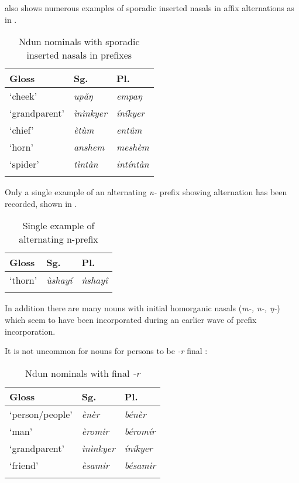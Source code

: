 \documentclass[output=paper]{langsci/langscibook}
\begin{document}
 also shows numerous examples of sporadic inserted nasals in affix alternations as in . 


\begin{table}
\caption{Ndun nominals with sporadic inserted nasals in prefixes}
\label{extab:nomaffplat:29}
\begin{tabularx}{.8\textwidth}{XXl}
\lsptoprule
 {Gloss} 	& {Sg.} 	&   {Pl.}\\
\midrule‘cheek’ 	&  \itshape upǎŋ 	&  \itshape empaŋ\\
‘grandparent’ 	&  \itshape ìnìnkyer 	&  \itshape íníkyer\\
‘chief’ 	&  \itshape ètùm 	&  \itshape entûm\\
‘horn’ 	&  \itshape anshem 	&  \itshape meshèm\\
‘spider’ 	&  \itshape tìntàn 	&  \itshape intíntàn\\
\lspbottomrule
\end{tabularx}
\end{table}


Only a single example of an alternating \textit{n-} prefix showing alternation has been recorded, shown in .

\begin{table}
\caption{Single example of alternating n-prefix}
\label{extab:nomaffplat:30}
\begin{tabularx}{.8\textwidth}{XXl}
\lsptoprule
Gloss 	& {Sg.} 	& {Pl.}\\
\midrule
‘thorn’ 	&  \itshape ùshayí 	&  \itshape ǹshayî\\
\lspbottomrule
\end{tabularx}
\end{table}
 
\newpage  
In addition there are many nouns with initial homorganic nasals (\textit{m-, n-, ŋ-}) which seem to have been incorporated during an earlier wave of prefix incorporation.

It is not uncommon for  nouns for persons to be \textit{-r} final :

\begin{table}
\caption{Ndun nominals with final \textit{-r}}
\label{extab:nomaffplat:31}
\begin{tabularx}{.8\textwidth}{XXl}
\lsptoprule
Gloss 	& {Sg.} 	& {Pl.}\\
\midrule
‘person/people’ 	&  \itshape ènèr 	&  \itshape bénèr\\
‘man’ 	&  \itshape èromir 	&  \itshape béromír\\
‘grandparent’ 	&  \itshape ìnìnkyer 	&  \itshape íníkyer\\
‘friend’ 	&  \itshape èsamir 	&  \itshape bésamir\\
 \lspbottomrule
\end{tabularx}
\end{table}
\end{document}
